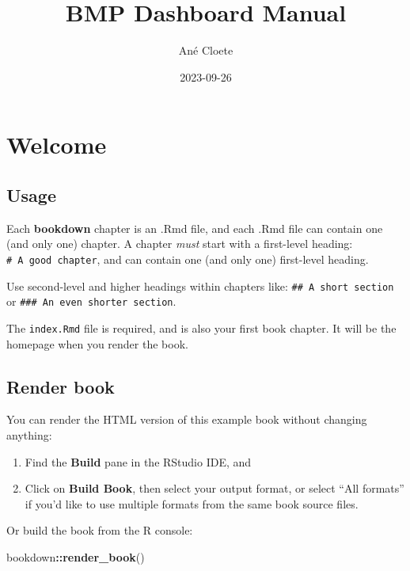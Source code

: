 \documentclass[
]{book}
\title{BMP Dashboard Manual}
\author{Ané Cloete}
\date{2023-09-26}
\newenvironment{Shaded}{\begin{snugshade}}{\end{snugshade}}
\newcommand{\FunctionTok}[1]{\textcolor[rgb]{0.13,0.29,0.53}{\textbf{#1}}}
\newcommand{\NormalTok}[1]{#1}
\newcommand{\SpecialCharTok}[1]{\textcolor[rgb]{0.81,0.36,0.00}{\textbf{#1}}}
\theoremstyle{definition}
\theoremstyle{definition}
\theoremstyle{definition}
\theoremstyle{definition}
\theoremstyle{remark}
\begin{document}
\maketitle

{
\setcounter{tocdepth}{1}
\tableofcontents
}
\hypertarget{welcome}{%
\chapter{Welcome}\label{welcome}}

\hypertarget{usage}{%
\section{Usage}\label{usage}}

Each \textbf{bookdown} chapter is an .Rmd file, and each .Rmd file can contain one (and only one) chapter. A chapter \emph{must} start with a first-level heading: \texttt{\#\ A\ good\ chapter}, and can contain one (and only one) first-level heading.

Use second-level and higher headings within chapters like: \texttt{\#\#\ A\ short\ section} or \texttt{\#\#\#\ An\ even\ shorter\ section}.

The \texttt{index.Rmd} file is required, and is also your first book chapter. It will be the homepage when you render the book.

\hypertarget{render-book}{%
\section{Render book}\label{render-book}}

You can render the HTML version of this example book without changing anything:

\begin{enumerate}
\def\labelenumi{\arabic{enumi}.}
\item
  Find the \textbf{Build} pane in the RStudio IDE, and
\item
  Click on \textbf{Build Book}, then select your output format, or select ``All formats'' if you'd like to use multiple formats from the same book source files.
\end{enumerate}

Or build the book from the R console:

\begin{Shaded}
\begin{Highlighting}[]
\NormalTok{bookdown}\SpecialCharTok{::}\FunctionTok{render\_book}\NormalTok{()}
\end{Highlighting}
\end{Shaded}
\end{document}
